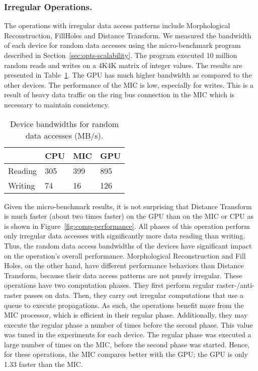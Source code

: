 \subsubsection{{\bf Irregular Operations.}}
The operations with irregular data access patterns include
Morphological Reconstruction, FillHoles and Distance Transform. We measured 
the bandwidth of each device for random data accesses using the micro-benchmark 
program described in Section~\ref{sec:opts-scalability}. The program executed 
10 million random reads and writes on a 4K4K matrix of integer 
values. 
The results are presented in Table~\ref{tab:random-bandwidth}. The GPU has 
much higher bandwidth as compared to the other devices. The performance of 
the MIC is low, especially for writes. This is a result of heavy data traffic 
on the ring bus connection in the MIC which is necessary to maintain
consistency. 
\begin{table}[h!]
\caption{Device bandwidths for random data accesses (MB/s).}
\vspace*{-2ex}
\begin{center}
\begin{tabular}{l l l l}
\hline
   	& CPU	& MIC	&	GPU 	\\ \hline \hline
Reading	& 305	& 399	&	895	\\ \hline
Writing	& 74	& 16	&     	126	\\ \hline
\end{tabular}
\end{center}
\label{tab:random-bandwidth}
\vspace*{-2ex}
\end{table}

Given the micro-benchmark results, it is not surprising that 
Distance Transform is much faster (about two times faster)
on the GPU than on the MIC or CPU as is shown in 
Figure~\ref{fig:comp-performance}. All phases of this operation perform only
irregular data accesses with significantly more data reading than writing. Thus, 
the random data access bandwidths of the devices have significant impact on 
the operation's overall performance.
Morphological Reconstruction and Fill Holes, on the other hand, have different 
performance behaviors than Distance Transform, because their data access 
patterns are not purely irregular. These operations have two computation 
phases. They first perform regular raster-/anti-raster passes on data. Then, 
they carry out irregular computations that use a queue to execute propagations. 
As such, the operations benefit more from the MIC processor, which is efficient in their
regular phase. Additionally, they may execute the regular phase a
number of times before the second phase. This value was tuned in the experiments 
for each device. The regular phase was 
executed a large number of times on the MIC, before the second phase was started. 
Hence, for these operations, the MIC compares better with the GPU; the GPU is
only 1.33 faster than the MIC.
